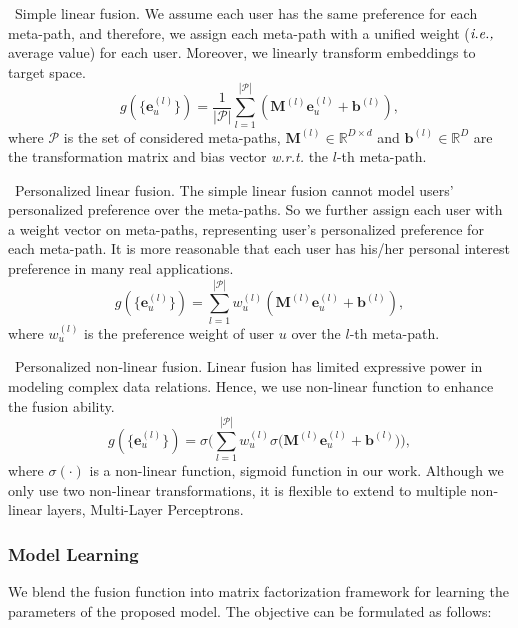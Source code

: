 \textbullet\ Simple linear fusion. We assume each user has the same preference for each meta-path, and therefore, we assign each meta-path with a unified weight ($\emph{i.e.,}$ average value) for each user. Moreover, we linearly transform embeddings to target space.
\begin{equation}\label{eq-slf}
g(\{\bm{e}^{(l)}_u\}) = \frac{1}{|\mathcal{P}|}\sum_{l=1}^{|\mathcal{P}|}{(\mathbf{M}^{(l)} \bm{e}^{(l)}_u+\bm{b}^{(l)})},
\end{equation}
where $\mathcal{P}$ is the set of considered meta-paths, $\mathbf{M}^{(l)} \in \mathbb{R}^{D\times d}$ and $\bm{b}^{(l)}  \in \mathbb{R}^{D}$ are the transformation matrix and bias vector \emph{w.r.t.} the $l$-th meta-path.

\textbullet\ Personalized linear fusion. The simple linear fusion cannot model users' personalized preference over the meta-paths. So we further assign each user with a weight vector on meta-paths, representing user's personalized preference for each meta-path. It is more reasonable that each user has his/her personal interest preference in many real applications.
\begin{equation}\label{eq-plf}
g(\{\bm{e}^{(l)}_u\}) = \sum_{l=1}^{|\mathcal{P}|}{w^{(l)}_u (\mathbf{M}^{(l)} \bm{e}^{(l)}_u+\bm{b}^{(l)})},
\end{equation}
where $w^{(l)}_u$ is the preference weight of user $u$ over the $l$-th meta-path.

\textbullet\ Personalized non-linear fusion. Linear fusion has limited expressive power in modeling complex data relations.
Hence, we use non-linear function to enhance the fusion ability.
\begin{equation}\label{eq-pnlf}
g(\{\bm{e}^{(l)}_u\}) = \sigma\bigg( \sum_{l=1}^{|\mathcal{P}|} {w^{(l)}_u \sigma\big(\mathbf{M}^{(l)} \bm{e}^{(l)}_u+\bm{b}^{(l)}\big)}\bigg),
\end{equation}
where $\sigma(\cdot)$ is a non-linear function, \ie sigmoid function in our work. Although we only use two non-linear transformations, it is flexible to extend to multiple non-linear layers, \eg Multi-Layer Perceptrons.

\subsubsection{Model Learning}
We blend the fusion function into matrix factorization framework for learning the parameters of the proposed model.
The objective can be formulated as follows:

